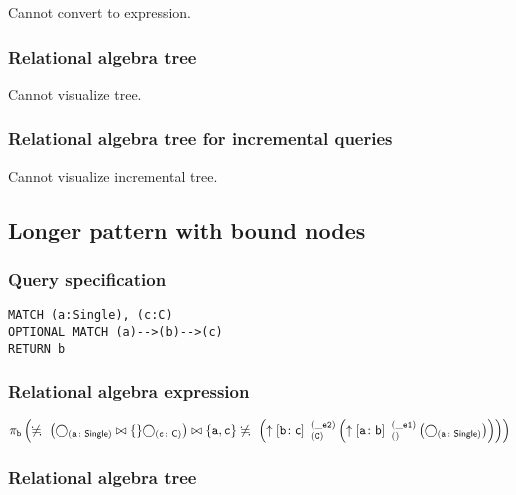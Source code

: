 Cannot convert to expression.

\subsubsection*{Relational algebra tree}

Cannot visualize tree.

\subsubsection*{Relational algebra tree for incremental queries}

Cannot visualize incremental tree.

\subsection{Longer pattern with bound nodes}

\subsubsection*{Query specification}

\begin{lstlisting}
MATCH (a:Single), (c:C)
OPTIONAL MATCH (a)-->(b)-->(c)
RETURN b
\end{lstlisting}

\subsubsection*{Relational algebra expression}

$\projection{\var{b}} \left(\alldifferent{} \left(\getvertices{a}{Single} \join \{\} \getvertices{c}{C}\right) \join \{\var{a}, \var{c}\} \alldifferent{} \left(\expandout{b}{c}{C}{\_e2}{} \left(\expandout{a}{b}{}{\_e1}{} \left(\getvertices{a}{Single}\right)\right)\right)\right)$

\subsubsection*{Relational algebra tree}

